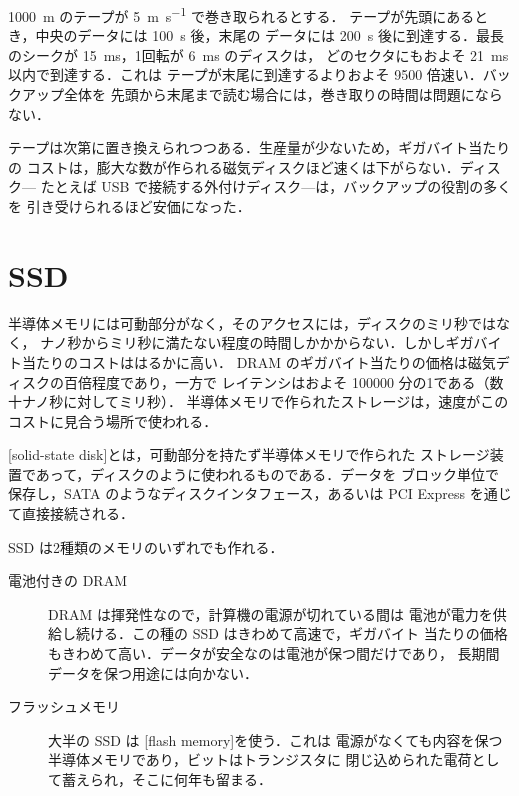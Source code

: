 \documentclass[../main.tex]{subfiles}
\begin{document}
\begin{example}
  \label{ex:l16-tape}
  \SI{1000}{\metre} のテープが
  \SI[per-mode=symbol]{5}{\metre\per\second} で巻き取られるとする．
  テープが先頭にあるとき，中央のデータには \SI{100}{\second} 後，末尾の
  データには \SI{200}{\second} 後に到達する．最長のシークが
  \SI{15}{\milli\second}，1回転が \SI{6}{\milli\second} のディスクは，
  どのセクタにもおよそ \SI{21}{\milli\second} 以内で到達する．これは
  テープが末尾に到達するよりおよそ \num{9500} 倍速い．バックアップ全体を
  先頭から末尾まで読む場合には，巻き取りの時間は問題にならない．
\end{example}

テープは次第に置き換えられつつある．生産量が少ないため，ギガバイト当たりの
コストは，膨大な数が作られる磁気ディスクほど速くは下がらない．ディスク---
たとえば USB で接続する外付けディスク---は，バックアップの役割の多くを
引き受けられるほど安価になった．

\section{SSD}
\label{sec:l16-ssd}

半導体メモリには可動部分がなく，そのアクセスには，ディスクのミリ秒ではなく，
ナノ秒からミリ秒に満たない程度の時間しかかからない．しかしギガバイト当たりのコストははるかに高い．
DRAM のギガバイト当たりの価格は磁気ディスクの百倍程度であり，一方で
レイテンシはおよそ \num{100000} 分の1である（数十ナノ秒に対してミリ秒）．
半導体メモリで作られたストレージは，速度がこのコストに見合う場所で使われる．

\begin{definition}[SSD]
  [solid-state disk]とは，可動部分を持たず半導体メモリで作られた
  ストレージ装置であって，ディスクのように使われるものである．データを
  ブロック単位で保存し，SATA のようなディスクインタフェース，あるいは
  PCI Express を通じて直接接続される．
\end{definition}

SSD は2種類のメモリのいずれでも作れる．
\begin{description}
  \item[電池付きの DRAM] DRAM は揮発性なので，計算機の電源が切れている間は
    電池が電力を供給し続ける．この種の SSD はきわめて高速で，ギガバイト
    当たりの価格もきわめて高い．データが安全なのは電池が保つ間だけであり，
    長期間データを保つ用途には向かない．
  \item[フラッシュメモリ] 大半の SSD は
    [flash memory]を使う．これは
    電源がなくても内容を保つ半導体メモリであり，ビットはトランジスタに
    閉じ込められた電荷として蓄えられ，そこに何年も留まる．
\end{description}
\end{document}
